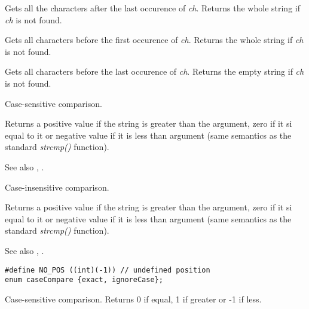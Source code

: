 Gets all the characters after the last occurence of {\it ch}.
Returns the whole string if {\it ch} is not found.

\label{wxstringbeforefirst}


Gets all characters before the first occurence of {\it ch}.
Returns the whole string if {\it ch} is not found.

\label{wxstringbeforelast}


Gets all characters before the last occurence of {\it ch}.
Returns the empty string if {\it ch} is not found.

\label{wxstringcmp}


Case-sensitive comparison.

Returns a positive value if the string is greater than the argument, zero if
it si equal to it or negative value if it is less than argument (same semantics
as the standard {\it strcmp()} function).

See also , .

\label{wxstringcmpnocase}


Case-insensitive comparison.

Returns a positive value if the string is greater than the argument, zero if
it si equal to it or negative value if it is less than argument (same semantics
as the standard {\it strcmp()} function).

See also , .

\label{wxstringcompareto}

\begin{verbatim}
#define NO_POS ((int)(-1)) // undefined position
enum caseCompare {exact, ignoreCase};
\end{verbatim}
  

Case-sensitive comparison. Returns 0 if equal, 1 if greater or -1 if less.

